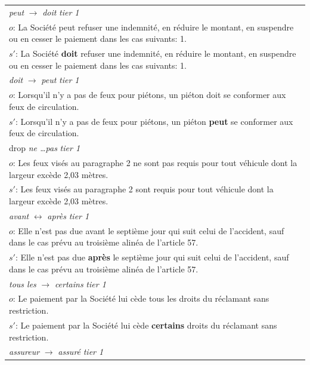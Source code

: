 \setlength{\tabcolsep}{4pt}
\begin{tabular}{@{}p{}@{}}
\toprule
\emph{peut} $\rightarrow$ \emph{doit} \hfill \emph{tier 1} \\[1pt]
\footnotesize $o$: La Société peut refuser une indemnité, en réduire le montant, en suspendre ou en cesser le paiement dans les cas suivants: 1. \\[1pt]
\footnotesize $s'$: La Société \textbf{doit} refuser une indemnité, en réduire le montant, en suspendre ou en cesser le paiement dans les cas suivants: 1. \\
\midrule
\emph{doit} $\rightarrow$ \emph{peut} \hfill \emph{tier 1} \\[1pt]
\footnotesize $o$: Lorsqu’il n’y a pas de feux pour piétons, un piéton doit se conformer aux feux de circulation. \\[1pt]
\footnotesize $s'$: Lorsqu’il n’y a pas de feux pour piétons, un piéton \textbf{peut} se conformer aux feux de circulation. \\
\midrule
drop \emph{ne \dots pas} \hfill \emph{tier 1} \\[1pt]
\footnotesize $o$: Les feux visés au paragraphe 2\textdegree{} ne sont pas requis pour tout véhicule dont la largeur excède 2,03 mètres. \\[1pt]
\footnotesize $s'$: Les feux visés au paragraphe 2\textdegree{} sont requis pour tout véhicule dont la largeur excède 2,03 mètres. \\
\midrule
\emph{avant} $\leftrightarrow$ \emph{apr\`es} \hfill \emph{tier 1} \\[1pt]
\footnotesize $o$: Elle n’est pas due avant le septième jour qui suit celui de l’accident, sauf dans le cas prévu au troisième alinéa de l’article 57. \\[1pt]
\footnotesize $s'$: Elle n’est pas due \textbf{après} le septième jour qui suit celui de l’accident, sauf dans le cas prévu au troisième alinéa de l’article 57. \\
\midrule
\emph{tous les} $\rightarrow$ \emph{certains} \hfill \emph{tier 1} \\[1pt]
\footnotesize $o$: Le paiement par la Société lui cède tous les droits du réclamant sans restriction. \\[1pt]
\footnotesize $s'$: Le paiement par la Société lui cède \textbf{certains} droits du réclamant sans restriction. \\
\midrule
\emph{assureur} $\rightarrow$ \emph{assur\'e} \hfill \emph{tier 1} \\[1pt]

\end{tabular}
